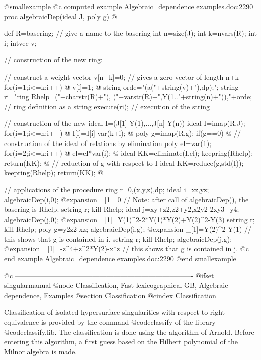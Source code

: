 @smallexample
@c computed example Algebraic_dependence examples.doc:2290 
  proc algebraicDep(ideal J, poly g)
  @{
    def R=basering;         // give a name to the basering
    int n=size(J);
    int k=nvars(R);
    int i;
    intvec v;

    // construction of the new ring:

    // construct a weight vector
    v[n+k]=0;         // gives a zero vector of length n+k
    for(i=1;i<=k;i++)
    @{
      v[i]=1;
    @}
    string orde="(a("+string(v)+"),dp);";
    string ri="ring Rhelp=("+charstr(R)+"),
                          ("+varstr(R)+",Y(1.."+string(n)+")),"+orde;
                            // ring definition as a string
    execute(ri);            // execution of the string

    // construction of the new ideal I=(J[1]-Y(1),...,J[n]-Y(n))
    ideal I=imap(R,J);
    for(i=1;i<=n;i++)
    @{
      I[i]=I[i]-var(k+i);
    @}
    poly g=imap(R,g);
    if(g==0)
    @{
      // construction of the ideal of relations by elimination
      poly el=var(1);
      for(i=2;i<=k;i++)
      @{
        el=el*var(i);
      @}
      ideal KK=eliminate(I,el);
      keepring(Rhelp);
      return(KK);
    @}
    // reduction of g with respect to I
    ideal KK=reduce(g,std(I));
    keepring(Rhelp);
    return(KK);
  @}

  // applications of the procedure
  ring r=0,(x,y,z),dp;
  ideal i=xz,yz;
  algebraicDep(i,0);
@expansion{} _[1]=0
  // Note: after call of algebraicDep(), the basering is Rhelp.
  setring r; kill Rhelp;
  ideal j=xy+z2,z2+y2,x2y2-2xy3+y4;
  algebraicDep(j,0);
@expansion{} _[1]=Y(1)^2-2*Y(1)*Y(2)+Y(2)^2-Y(3)
  setring r; kill Rhelp;
  poly g=y2z2-xz;
  algebraicDep(i,g);
@expansion{} _[1]=Y(2)^2-Y(1)
  // this shows that g is contained in i.
  setring r; kill Rhelp;
  algebraicDep(j,g);
@expansion{} _[1]=-z^4+z^2*Y(2)-x*z
  // this shows that g is contained in j.
@c end example Algebraic_dependence examples.doc:2290
@end smallexample

@c ----------------------------------------------------------------------------
@ifset singularmanual
@node Classification, Fast lexicographical GB, Algebraic dependence, Examples
@section Classification
@cindex Classification

Classification of isolated hypersurface singularities with respect to
right equivalence is provided by the command @code{classify} of the
library @code{classify.lib}. The classification is done using the
algorithm of Arnold. Before entering this algorithm, a first guess based
on the Hilbert polynomial of the Milnor algebra is made.

